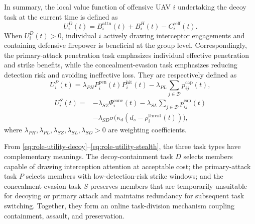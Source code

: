 \documentclass{cja}
\begin{document}
In summary, the local value function of offensive UAV $i$ undertaking the decoy task at the current time is defined as
\begin{equation}
U_i^{D}(t)
=
B_i^{\mathrm{attn}}(t)
+
B_i^{H}(t)
-
C_i^{\mathrm{self}}(t).
\label{eq:role-utility-decoy}
\end{equation}
When $U_i^{D}(t)>0$, individual $i$ actively drawing interceptor engagements and containing defensive firepower is beneficial at the group level.
Correspondingly, the primary-attack penetration task emphasizes individual effective penetration and strike benefits, while the concealment-evasion task emphasizes reducing detection risk and avoiding ineffective loss. They are respectively defined as
\begin{equation}
U_i^{P}(t)
=
\lambda_{PH}P_i^{\mathrm{pen}}(t)P_i^{\mathrm{hit}}(t)
-
\lambda_{PL}\sum_{j\in\mathcal D}p_{ij}^{\mathrm{cap}}(t),
\label{eq:role-utility-pen}
\end{equation}
\begin{equation}
\begin{aligned}
U_i^{S}(t)
={}&
-\lambda_{SZ}\Psi_i^{\mathrm{cone}}(t)
-\lambda_{SL}\sum_{j\in\mathcal D}p_{ij}^{\mathrm{cap}}(t)\\
&-\lambda_{SD}\sigma\!\bigl(\kappa_d(d_s-\rho_i^{\mathrm{threat}}(t))\bigr),
\end{aligned}
\label{eq:role-utility-stealth}
\end{equation}
where $\lambda_{PH},\lambda_{PL},\lambda_{SZ},\lambda_{SL},\lambda_{SD}>0$ are weighting coefficients.

From \eqref{eq:role-utility-decoy}--\eqref{eq:role-utility-stealth}, the three task types have complementary meanings. The decoy-containment task $D$ selects members capable of drawing interception attention at acceptable cost; the primary-attack task $P$ selects members with low-detection-risk strike windows; and the concealment-evasion task $S$ preserves members that are temporarily unsuitable for decoying or primary attack and maintains redundancy for subsequent task switching. Together, they form an online task-division mechanism coupling containment, assault, and preservation.
\end{document}
